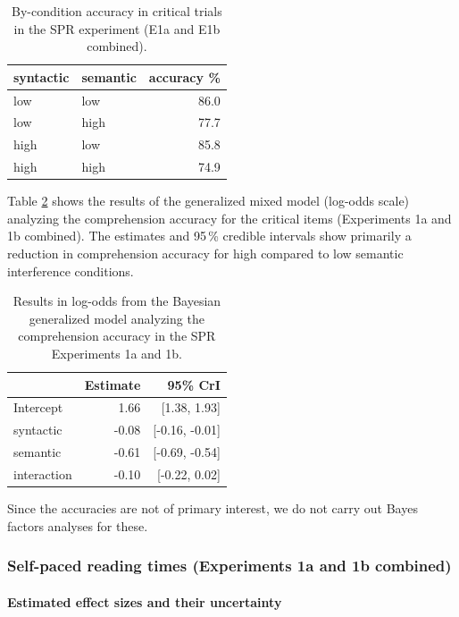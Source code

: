 \documentclass[a4paper, man, floatsintext]{apa7}
\begin{document}
\begin{table}[]
    \caption{By-condition accuracy in critical trials in the SPR experiment (E1a and E1b combined).}
    \label{tab:spr_acc}
    \centering
    \begin{tabular}{llr}
    \toprule
    syntactic & semantic & accuracy \%\\
    \midrule
        low &  low & 86.0\\
        low &  high & 77.7\\
        high &  low & 85.8\\
        high &  high & 74.9\\
    \bottomrule
    \end{tabular}
\end{table}

Table \ref{tab:spr_acc_mod} shows the results of the generalized mixed model (log-odds scale) analyzing the comprehension accuracy for the critical items (Experiments 1a and 1b combined). The estimates and 95\,\% credible intervals show primarily a reduction in comprehension accuracy for high compared to low semantic interference conditions.

\begin{table}[H]
    \caption{Results in log-odds from the Bayesian generalized model analyzing the comprehension accuracy in the SPR Experiments 1a and 1b.}
    \label{tab:spr_acc_mod}
    \centering
    \begin{tabular}{lrr}
    \toprule
    & Estimate &  95\% CrI  \\
    \midrule
Intercept& 1.66 &   [1.38, 1.93]\\
syntactic& -0.08 &  [-0.16, -0.01]\\
semantic&  -0.61 & [-0.69, -0.54]\\
interaction& -0.10&  [-0.22, 0.02]\\
    \bottomrule
    \end{tabular}
\end{table}

Since the accuracies are not of primary interest, we do not carry out Bayes factors analyses for these.

\subsubsection{Self-paced reading times (Experiments 1a and 1b combined)}

\paragraph{Estimated effect sizes and their uncertainty}
\end{document}
